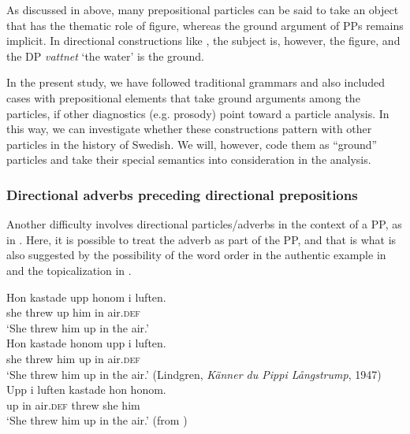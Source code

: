 \documentclass[output=paper]{langscibook}
\begin{document}
As discussed in  above, many prepositional particles can be said to take an object that has the thematic role of figure, whereas the ground argument of PPs remains implicit. In directional constructions like , the subject is, however, the figure, and the DP \textit{vattnet} ‘the water’ is the ground.



In the present study, we have followed traditional grammars and also included cases with prepositional elements that take ground arguments among the particles, if other diagnostics (e.g. prosody) point toward a particle analysis. In this way, we can investigate whether these constructions pattern with other particles in the history of Swedish. We will, however, code them as “ground” particles and take their special semantics into consideration in the analysis.



\subsubsection{Directional adverbs preceding directional prepositions} 
Another difficulty involves directional particles/adverbs in the context of a PP, as in . Here, it is possible to treat the adverb as part of the PP, and that is what is also suggested by the possibility of the word order in the authentic example in  and the topicalization in .


\ea\label{ex:lalu:17}
\ea\label{ex:lalu:17a}
\gll  Hon   kastade   upp    honom   i   luften.\\
    she     threw   up   him     in     air\textsc{.def}\\
\glt `She threw him up in the air.’\\

\ex\label{ex:lalu:17b}
\gll  Hon   kastade   honom   upp   i   luften.\\
    she     threw   him     up   in   air\textsc{.def}\\
\glt `She threw him up in the air.’ (Lindgren, \textit{Känner du Pippi Långstrump}, 1947)\\
\ex\label{ex:lalu:17c}
\gll Upp   i   luften   kastade   hon   honom. \\
    up     in   air.\textsc{def}   threw   she   him\\
\glt `She threw him up in the air.’     (from \citealt{LarssonLundquist2014})\\
\z
\z
\end{document}
